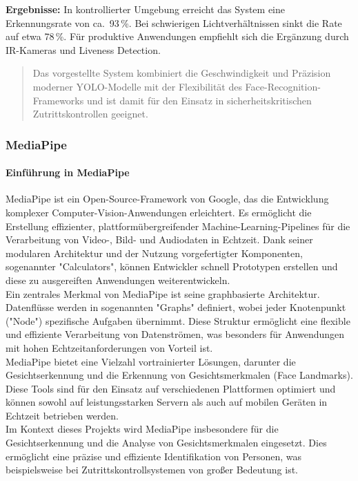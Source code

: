 \textbf{Ergebnisse:} In kontrollierter Umgebung erreicht das System eine Erkennungsrate von ca.~93\,\%. Bei schwierigen Lichtverhältnissen sinkt die Rate auf etwa 78\,\%. Für produktive Anwendungen empfiehlt sich die Ergänzung durch IR-Kameras und Liveness Detection.

\begin{quote}
Das vorgestellte System kombiniert die Geschwindigkeit und Präzision moderner YOLO-Modelle mit der Flexibilität des Face-Recognition-Frameworks und ist damit für den Einsatz in sicherheitskritischen Zutrittskontrollen geeignet.
\end{quote}

\subsubsection{MediaPipe}
\paragraph{Einführung in MediaPipe}
MediaPipe ist ein Open-Source-Framework von Google, das die Entwicklung komplexer Computer-Vision-Anwendungen erleichtert. Es ermöglicht die Erstellung effizienter, plattformübergreifender Machine-Learning-Pipelines für die Verarbeitung von Video-, Bild- und Audiodaten in Echtzeit. Dank seiner modularen Architektur und der Nutzung vorgefertigter Komponenten, sogenannter "Calculators", können Entwickler schnell Prototypen erstellen und diese zu ausgereiften Anwendungen weiterentwickeln.  \\
Ein zentrales Merkmal von MediaPipe ist seine graphbasierte Architektur. Datenflüsse werden in sogenannten "Graphs" definiert, wobei jeder Knotenpunkt ("Node") spezifische Aufgaben übernimmt. Diese Struktur ermöglicht eine flexible und effiziente Verarbeitung von Datenströmen, was besonders für Anwendungen mit hohen Echtzeitanforderungen von Vorteil ist.  \\
MediaPipe bietet eine Vielzahl vortrainierter Lösungen, darunter die Gesichtserkennung und die Erkennung von Gesichtsmerkmalen (Face Landmarks). Diese Tools sind für den Einsatz auf verschiedenen Plattformen optimiert und können sowohl auf leistungsstarken Servern als auch auf mobilen Geräten in Echtzeit betrieben werden. \\
Im Kontext dieses Projekts wird MediaPipe insbesondere für die Gesichtserkennung und die Analyse von Gesichtsmerkmalen eingesetzt. Dies ermöglicht eine präzise und effiziente Identifikation von Personen, was beispielsweise bei Zutrittskontrollsystemen von großer Bedeutung ist.\\

